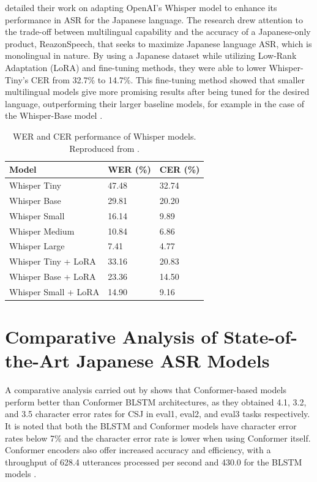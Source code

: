 \textcite{bajo2024efficient} detailed their work on adapting OpenAI's Whisper model to enhance its performance in ASR for the Japanese language. The research drew attention to the trade-off between multilingual capability and the accuracy of a Japanese-only product, ReazonSpeech, that seeks to maximize Japanese language ASR, which is monolingual in nature. By using a Japanese dataset while utilizing Low-Rank Adaptation (LoRA) and fine-tuning methods, they were able to lower Whisper-Tiny's CER from 32.7\% to 14.7\%. This fine-tuning method showed that smaller multilingual models give more promising results after being tuned for the desired language, outperforming their larger baseline models, for example in the case of the Whisper-Base model \parencite{bajo2024efficient}.

\begin{table}[ht]
    \centering
    \caption{WER and CER performance of Whisper models. Reproduced from \cite{bajo2024efficient}.}
    \begin{tabular}{p{4cm}|p{3cm}|p{3cm}}
    \hline
    \textbf{Model}        & \textbf{WER (\%)} & \textbf{CER (\%)} \\ \hline
    Whisper Tiny          & 47.48             & 32.74             \\
    Whisper Base          & 29.81             & 20.20             \\
    Whisper Small         & 16.14             & 9.89              \\
    Whisper Medium        & 10.84             & 6.86              \\
    Whisper Large         & 7.41              & 4.77              \\ \hline
    Whisper Tiny + LoRA   & 33.16             & 20.83             \\
    Whisper Base + LoRA   & 23.36             & 14.50             \\
    Whisper Small + LoRA  & 14.90             & 9.16              \\ \hline
    \end{tabular}
    \label{tab:whisper-performance}
\end{table}

\section{Comparative Analysis of State-of-the-Art Japanese ASR Models}
A comparative analysis carried out by \textcite{Karita2021} shows that Conformer-based models perform better than Conformer BLSTM architectures, as they obtained 4.1, 3.2, and 3.5 character error rates for CSJ in eval1, eval2, and eval3 tasks respectively. It is noted that both the BLSTM and Conformer models have character error rates below 7\% and the character error rate is lower when using Conformer itself. Conformer encoders also offer increased accuracy and efficiency, with a throughput of 628.4 utterances processed per second and 430.0 for the BLSTM models \parencite{Karita2021}.

